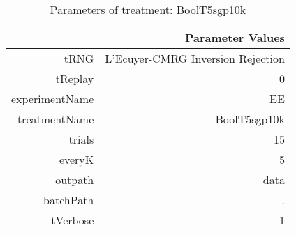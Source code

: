 \begin{table}[ht]
\centering
\begin{tabular}{rr}
  \hline
 & Parameter Values \\ 
  \hline
tRNG & L'Ecuyer-CMRG Inversion Rejection \\ 
  tReplay & 0 \\ 
  experimentName & EE \\ 
  treatmentName & BoolT5sgp10k \\ 
  trials & 15 \\ 
  everyK & 5 \\ 
  outpath & data \\ 
  batchPath & . \\ 
  tVerbose & 1 \\ 
   \hline
\end{tabular}
\caption{ Parameters of treatment: BoolT5sgp10k 
} 
\end{table}
